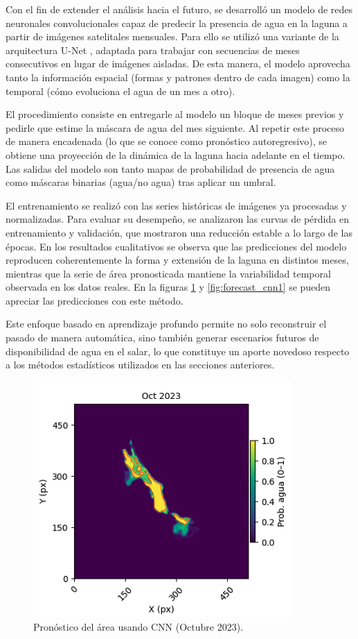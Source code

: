 Con el fin de extender el análisis hacia el futuro, se desarrolló un modelo de redes neuronales convolucionales capaz de predecir la presencia de agua en la laguna a partir de imágenes satelitales mensuales. Para ello se utilizó una variante de la arquitectura U-Net , adaptada para trabajar con secuencias de meses consecutivos en lugar de imágenes aisladas. De esta manera, el modelo aprovecha tanto la información espacial (formas y patrones dentro de cada imagen) como la temporal (cómo evoluciona el agua de un mes a otro).

El procedimiento consiste en entregarle al modelo un bloque de meses previos y pedirle que estime la máscara de agua del mes siguiente. Al repetir este proceso de manera encadenada (lo que se conoce como pronóstico autoregresivo), se obtiene una proyección de la dinámica de la laguna hacia adelante en el tiempo. Las salidas del modelo son tanto mapas de probabilidad de presencia de agua como máscaras binarias (agua/no agua) tras aplicar un umbral.

El entrenamiento se realizó con las series históricas de imágenes ya procesadas y normalizadas. Para evaluar su desempeño, se analizaron las curvas de pérdida en entrenamiento y validación, que mostraron una reducción estable a lo largo de las épocas. En los resultados cualitativos se observa que las predicciones del modelo reproducen coherentemente la forma y extensión de la laguna en distintos meses, mientras que la serie de área pronosticada mantiene la variabilidad temporal observada en los datos reales. En la figuras \ref{fig:forecast_cnn} y \ref{fig:forecast_cnn1} se pueden apreciar las predicciones con este método. 

Este enfoque basado en aprendizaje profundo permite no solo reconstruir el pasado de manera automática, sino también generar escenarios futuros de disponibilidad de agua en el salar, lo que constituye un aporte novedoso respecto a los métodos estadísticos utilizados en las secciones anteriores.

\begin{figure}[H]
    \centering
    \includegraphics[scale=0.50]{Figures/forecast_cnn1.png}
    \caption{Pronóstico del área usando CNN (Octubre 2023).}
    \label{fig:forecast_cnn}
\end{figure}




